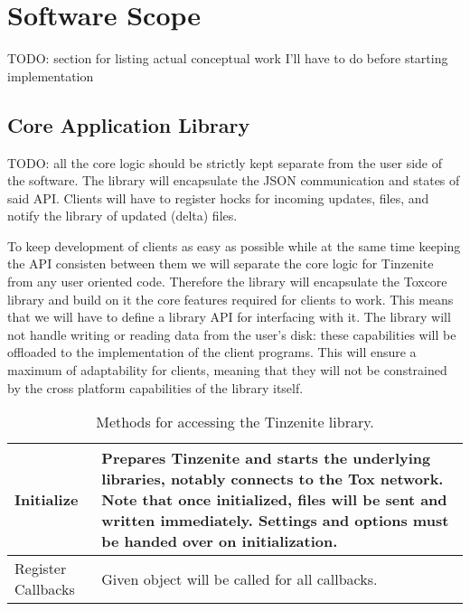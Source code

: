 \section{Software Scope}

TODO: section for listing actual conceptual work I'll have to do before starting implementation

\subsection{Core Application Library}

TODO: all the core logic should be strictly kept separate from the user side of the software.
The library will encapsulate the JSON communication and states of said API.
Clients will have to register hocks for incoming updates, files, and notify the library of updated (delta) files.

To keep development of clients as easy as possible while at the same time keeping the API consisten between them we will separate the core logic for Tinzenite from any user oriented code.
Therefore the library will encapsulate the Toxcore library and build on it the core features required for clients to work.
This means that we will have to define a library API for interfacing with it.
The library will not handle writing or reading data from the user's disk: these capabilities will be offloaded to the implementation of the client programs.
This will ensure a maximum of adaptability for clients, meaning that they will not be constrained by the cross platform capabilities of the library itself.

\begin{table}[H]
\centering
\begin{tabulary}{\textwidth}{p{2.5cm} || J}
	Initialize & Prepares Tinzenite and starts the underlying libraries, notably connects to the Tox network. Note that once initialized, files will be sent and written immediately. Settings and options must be handed over on initialization.\\
	\hline
    Register Callbacks & Given object will be called for all callbacks.\\
\end{tabulary}
\caption[Tinzenite Library API]{Methods for accessing the Tinzenite library.}
\label{table:lib:api}
\end{table}

